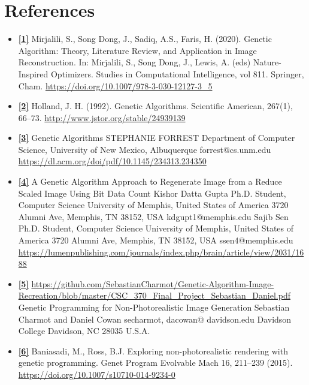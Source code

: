 \documentclass[10pt, conference]{IEEEtran}
\begin{document}
\section{References}
\begin{itemize}
	\item \textbf{\hyperref[sec:1]{[1]\label{sec:1r}}} Mirjalili, S., Song Dong, J., Sadiq, A.S., Faris, H. (2020). Genetic Algorithm: Theory, Literature Review, and Application in Image Reconstruction. In: Mirjalili, S., Song Dong, J., Lewis, A. (eds) Nature-Inspired Optimizers. Studies in Computational Intelligence, vol 811. Springer, Cham.
	      \url{https://doi.org/10.1007/978-3-030-12127-3_5}

	\item \textbf{\hyperref[sec:2]{[2]\label{sec:2r}}} Holland, J. H. (1992). Genetic Algorithms. Scientific American, 267(1), 66–73. \url{http://www.jstor.org/stable/24939139}
	\item \textbf{\hyperref[sec:3]{[3]\label{sec:3r}}} Genetic Algorithms
	      STEPHANIE FORREST
	      Department of Computer Science, University of New Mexico, Albuquerque forrest@cs.unm.edu
	      \url{https://dl.acm.org/doi/pdf/10.1145/234313.234350}
	\item \textbf{\hyperref[sec:4]{[4]\label{sec:4r}}} A Genetic Algorithm Approach to Regenerate Image from a Reduce Scaled Image Using Bit Data Count Kishor Datta Gupta Ph.D. Student, Computer Science University of Memphis, United States of America 3720 Alumni Ave, Memphis, TN 38152, USA kdgupt1@memphis.edu Sajib Sen Ph.D. Student, Computer Science University of Memphis, United States of America 3720 Alumni Ave, Memphis, TN 38152, USA ssen4@memphis.edu \url{https://lumenpublishing.com/journals/index.php/brain/article/view/2031/1688}

	\item \textbf{\hyperref[sec:5]{[5]\label{sec:5r}}} \url{https://github.com/SebastianCharmot/Genetic-Algorithm-Image-Recreation/blob/master/CSC_370_Final_Project_Sebastian_Daniel.pdf}
	      Genetic Programming for Non-Photorealistic Image Generation
	      Sebastian Charmot and Daniel Cowan
	      secharmot,
	      dacowan@
	      davidson.edu
	      Davidson College
	      Davidson, NC 28035
	      U.S.A.

	\item \textbf{\hyperref[sec:6]{[6]\label{sec:6r}}} Baniasadi, M., Ross, B.J. Exploring non-photorealistic rendering with genetic programming. Genet Program Evolvable Mach 16, 211–239 (2015). \url{https://doi.org/10.1007/s10710-014-9234-0}
\end{itemize}
\end{document}
